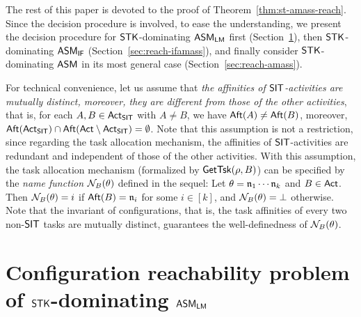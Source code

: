 The rest of this paper is devoted to the proof of Theorem~\ref{thm:st-amass-reach}. Since the decision procedure is involved, to ease the understanding, we present the decision procedure for ${\sf STK}$-dominating $\textsf{ASM}_\textsf{LM}$ first (Section~\ref{sec:reach-lmamass}), then ${\sf STK}$-dominating $\textsf{ASM}_\textsf{IF}$ (Section~\ref{sec:reach-ifamass}), and finally consider ${\sf STK}$-dominating $\textsf{ASM}$ in its most general case (Section~\ref{sec:reach-amass}). 

For technical convenience, let us assume that \emph{the affinities of ${\sf SIT}$-activities are mutually distinct, moreover, they are different from those of the other activities}, that is, for each $A, B \in {\sf Act}_{\sf SIT}$ with $A \neq B$, we have ${\sf Aft}(A) \neq {\sf Aft}(B)$, moreover, ${\sf Aft}({\sf Act}_{\sf SIT}) \cap {\sf Aft}({\sf Act} \setminus {\sf Act}_{\sf SIT}) = \emptyset$. Note that this assumption is not a restriction, since regarding the task allocation mechanism, the affinities of ${\sf SIT}$-activities are redundant and independent of those of the other activities. With this assumption, the task allocation mechanism (formalized by $\mathsf{GetTsk}(\rho, B)$) can be specified by the \emph{name function} $\mathcal{N}_B(\theta)$ defined in the sequel:  Let $\theta = \mathfrak{n}_1 \cdots \mathfrak{n}_k$ and $B \in {\sf Act}$. Then $\mathcal{N}_B(\theta) = i$ if ${\sf Aft}(B) = \mathfrak{n}_i$ for some $i \in [k]$, and $\mathcal{N}_B(\theta) = \bot$ otherwise. Note that the invariant of configurations, that is, the task affinities of every two non-${\sf SIT}$ tasks are mutually distinct, guarantees the well-definedness of $\mathcal{N}_B(\theta)$.




\section{Configuration reachability problem of $\mathsf{STK}$-dominating $\textsf{ASM}_\textsf{LM}$}\label{sec:reach-lmamass}


